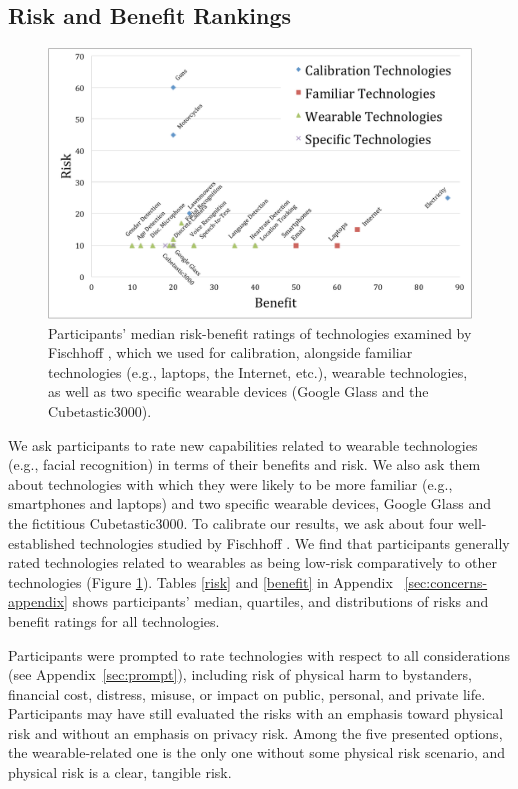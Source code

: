 
\subsection{Risk and Benefit Rankings} 
\begin{figure}[t]
	\centering
	\includegraphics[width=\columnwidth]{images/riskbenefit.pdf}
	\caption{Participants' median risk-benefit ratings of technologies examined by Fischhoff \etal\cite{Fischhoff}, which we used for calibration, alongside familiar technologies (e.g., laptops, the Internet, etc.), wearable technologies, as well as two specific wearable devices (Google Glass and the Cubetastic3000).}
	\label{fig:techplot}
\end{figure}

We ask participants to rate new capabilities related to wearable technologies (e.g., facial recognition) in terms of their  benefits and risk. We also ask them about technologies with which they were likely to be more familiar (e.g., smartphones and laptops) and two specific wearable devices, Google Glass and the fictitious Cubetastic3000. To calibrate our results, we  ask about four well-established technologies studied by Fischhoff \etal\cite{Fischhoff}. We find that participants generally rated technologies related to wearables as being low-risk comparatively to other technologies (Figure \ref{fig:techplot}). Tables \ref{risk} and \ref{benefit} in Appendix ~\ref{sec:concerns-appendix} shows participants' median, quartiles, and distributions of risks and benefit ratings for all technologies. 

Participants were prompted to rate technologies with respect to all considerations (see Appendix~\ref{sec:prompt}), including risk of physical harm to bystanders, financial cost, distress, misuse, or impact on public, personal, and private life. Participants may have still evaluated the risks with an emphasis toward physical risk and without an emphasis on privacy risk. Among the five presented options, the wearable-related one is the only one without some physical risk scenario, and physical risk is a clear, tangible risk. 

